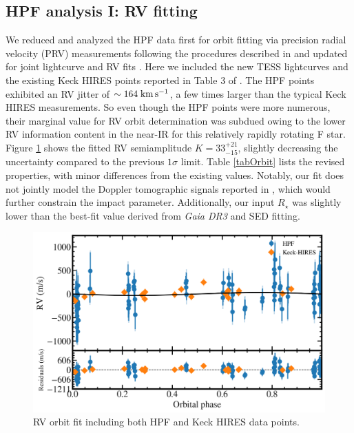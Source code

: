 \documentclass[twocolumn]{aastex631}
\newcommand{\rstar}{\ensuremath{R_\star}}
\newcommand{\kms}{\ensuremath{\rm km\,s^{-1}}}
\begin{document}
\subsection{HPF analysis I: RV fitting}

We reduced and analyzed the HPF data first for orbit fitting via precision radial velocity (PRV) measurements following the procedures described in \citet{2021AJ....161..173T} and updated for joint lightcurve and RV fits \citep{2022AJ....163..225T}.  Here we included the new TESS lightcurves and the existing Keck HIRES points reported in Table 3 of \citet{2017AJ....153..211Z}.  The HPF points exhibited an RV jitter of $\sim164\;\kms$, a few times larger than the typical Keck HIRES measurements.  So even though the HPF points were more numerous, their marginal value for RV orbit determination was subdued owing to the lower RV information content in the near-IR for this relatively rapidly rotating F star.  Figure \ref{fig:RVfit} shows the fitted RV semiamplitude $K=33_{-15}^{+21}$, slightly decreasing the uncertainty compared to the previous $1\sigma$ limit.  Table \ref{tabOrbit} lists the revised properties, with minor differences from the existing values.  Notably, our fit does not jointly model the Doppler tomographic signals reported in \citep{2017AJ....153..211Z}, which would further constrain the impact parameter.  Additionally, our input $\rstar$ was slightly lower than the best-fit value derived from \emph{Gaia DR3} and SED fitting.

\begin{figure}
    \includegraphics[width=\linewidth]{figures/HAT-P-67b_rv.pdf}
    \caption{RV orbit fit including both HPF and Keck HIRES data points.}
    \label{fig:RVfit}
\end{figure}
\end{document}
